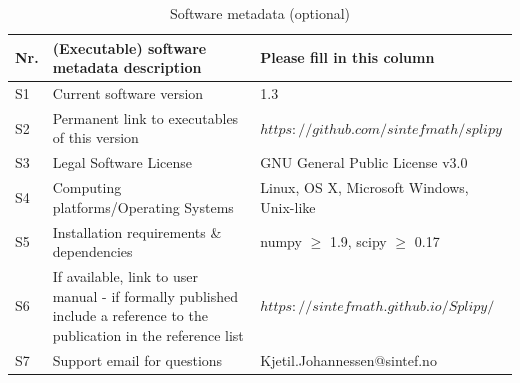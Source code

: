 \documentclass[preprint,12pt, a4paper]{elsarticle}
\begin{document}
\begin{table}[!h]
\begin{tabular}{|l|p{6.5cm}|p{6.5cm}|}
\hline
\textbf{Nr.} & \textbf{(Executable) software metadata description} & \textbf{Please fill in this column} \\
\hline
S1 & Current software version & 1.3 \\
\hline
S2 & Permanent link to executables of this version  & $https://github.com/sintefmath/splipy$ \\
\hline
S3 & Legal Software License & GNU General Public License v3.0 \\
\hline
S4 & Computing platforms/Operating Systems & Linux, OS X, Microsoft Windows, Unix-like \\
\hline
S5 & Installation requirements \& dependencies & numpy $\geq$ 1.9, scipy $\geq$ 0.17 \\
\hline
S6 & If available, link to user manual - if formally published include a reference to the publication in the reference list & $https://sintefmath.github.io/Splipy/$ \\
\hline
S7 & Support email for questions & Kjetil.Johannessen@sintef.no \\
\hline
\end{tabular}
\caption{Software metadata (optional)}
\label{} 
\end{table}
\end{document}
